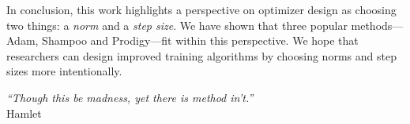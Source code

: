In conclusion, this work highlights a perspective on optimizer design as choosing two things: a \textit{norm} and a \textit{step size}. We have shown that three popular methods---Adam, Shampoo and Prodigy---fit within this perspective. We hope that researchers can design improved training algorithms by choosing norms and step sizes more intentionally.

\vspace{1em}


\hfill \textit{``Though this be madness, yet there is method in't.''}\\
\vspace{-2ex}
\hfill Hamlet

















